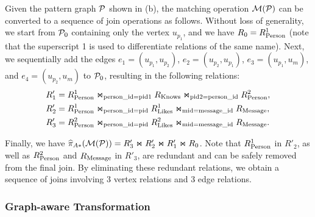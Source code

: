 \begin{example}
  Given the pattern graph $\mathcal{P}$ shown in (b), the matching operation $\mathcal{M}(\mathcal{P})$ can be converted to a sequence of join operations as follows. Without loss of generality, we start from $\mathcal{P}_0$ containing only the vertex $u_{p_1}$, and we have ${R_{0}} = {R^{1}_{\text{Person}}}$ (note that the superscript 1 is used to differentiate relations of the same name).
  Next, we sequentially add the edges $e_1 = (u_{p_1}, u_{p_2})$, $e_2 = (u_{p_2}, u_{p_1})$, $e_3 = (u_{p_1}, u_m)$, and $e_4 = (u_{p_2}, u_m)$ to $\mathcal{P}_0$, resulting in the following relations:
  \begin{equation*}
    \begin{split}
    R'_1 &= {R^{1}_{\text{Person}}} \Join_{\text{person\_id}=\text{pid1}} {R_{\text{Knows}}} \Join_{\text{pid2}=\text{person\_id}} {R^{2}_{\text{Person}}}, \\
    R'_2 &= {R^{1}_{\text{Person}}} \Join_{\text{person\_id}=\text{pid}} {R^{1}_{\text{Likes}}} \Join_{\text{mid}=\text{message\_id}} {R_{\text{Message}}}, \\
    R'_3 &= {R^{2}_{\text{Person}}} \Join_{\text{person\_id}=\text{pid}} {R^{2}_{\text{Likes}}} \Join_{\text{mid}=\text{message\_id}} {R_{\text{Message}}}.
    \end{split}
    \end{equation*}

    Finally, we have $\widehat{\pi}_{A*}(\mathcal{M}(\mathcal{P})) = R'_3 \Join R'_2 \Join R'_1 \Join {\ensuremath R_{0}}$.
    Note that ${R^{1}_{\text{Person}}}$ in $R'_2$, as well as ${R^{2}_{\text{Person}}}$ and ${R_{\text{Message}}}$ in $R'_3$, are redundant and can be safely removed from the final join. By eliminating these redundant relations, we obtain a sequence of joins involving 3 vertex relations and 3 edge relations.
\end{example}

\subsubsection{Graph-aware Transformation}
\label{sec:graph-aware}

